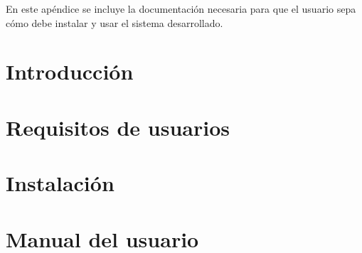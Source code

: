 
En este apéndice se incluye la documentación necesaria para que el usuario sepa cómo debe instalar y usar el sistema desarrollado.

\section{Introducción}

\section{Requisitos de usuarios}

\section{Instalación}

\section{Manual del usuario}


